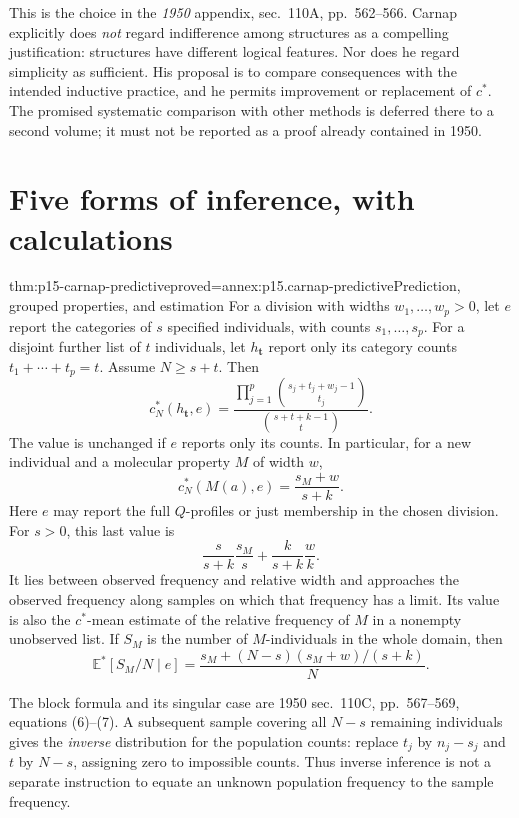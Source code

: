 This is the choice in the \emph{1950} appendix, sec.~110A,
pp.~562--566. Carnap explicitly does \emph{not} regard indifference
among structures as a compelling justification: structures have different
logical features. Nor does he regard simplicity as sufficient. His
proposal is to compare consequences with the intended inductive practice,
and he permits improvement or replacement of \(c^*\). The promised
systematic comparison with other methods is deferred there to a second
volume; it must not be reported as a proof already contained in 1950.

\section{Five forms of inference, with calculations}
\label{sec:p15-carnap-methods}

\begin{hbtheorem}{thm:p15-carnap-predictive}{proved=annex:p15.carnap-predictive}{Prediction, grouped properties, and estimation}
For a division with widths \(w_1,\ldots,w_p>0\), let \(e\) report
the categories of \(s\) specified individuals, with counts
\(s_1,\ldots,s_p\). For a disjoint further list of \(t\)
individuals, let \(h_{\boldsymbol t}\) report only its category counts
\(t_1+\cdots+t_p=t\). Assume \(N\geq s+t\). Then
\[
 c_N^*(h_{\boldsymbol t},e)
 =\frac{\prod_{j=1}^p\binom{s_j+t_j+w_j-1}{t_j}}
        {\binom{s+t+k-1}{t}}.
\]
The value is unchanged if \(e\) reports only its counts. In particular,
for a new individual and a molecular property \(M\) of width \(w\),
\[
 c_N^*(M(a),e)=\frac{s_M+w}{s+k}.
\]
Here \(e\) may report the full \(Q\)-profiles or just membership in
the chosen division. For \(s>0\), this last value is
\[
 \frac{s}{s+k}\frac{s_M}{s}+\frac{k}{s+k}\frac wk.
\]
It lies between observed frequency and relative width and approaches the
observed frequency along samples on which that frequency has a limit.
Its value is also the \(c^*\)-mean estimate of the relative frequency
of \(M\) in a nonempty unobserved list. If \(S_M\) is the number
of \(M\)-individuals in the whole domain, then
\[
 \mathbb E^*[S_M/N\mid e]
 =\frac{s_M+(N-s)(s_M+w)/(s+k)}{N}.
\]
\end{hbtheorem}

The block formula and its singular case are 1950 sec.~110C,
pp.~567--569, equations (6)--(7). A subsequent sample covering all
\(N-s\) remaining individuals gives the \emph{inverse} distribution
for the population counts: replace \(t_j\) by \(n_j-s_j\) and
\(t\) by \(N-s\), assigning zero to impossible counts. Thus inverse
inference is not a separate instruction to equate an unknown population
frequency to the sample frequency.

